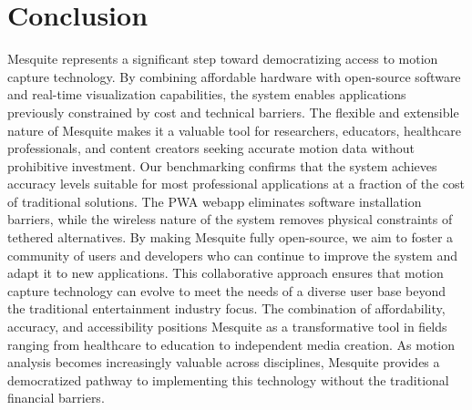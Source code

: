 \documentclass[lettersize,journal]{IEEEtran}
\begin{document}
\section{Conclusion}
Mesquite represents a significant step toward democratizing access to motion capture technology. By combining affordable hardware with open-source software and real-time visualization capabilities, the system enables applications previously constrained by cost and technical barriers. The flexible and extensible nature of Mesquite makes it a valuable tool for researchers, educators, healthcare professionals, and content creators seeking accurate motion data without prohibitive investment.
Our benchmarking confirms that the system achieves accuracy levels suitable for most professional applications at a fraction of the cost of traditional solutions. The PWA webapp eliminates software installation barriers, while the wireless nature of the system removes physical constraints of tethered alternatives. By making Mesquite fully open-source, we aim to foster a community of users and developers who can continue to improve the system and adapt it to new applications. This collaborative approach ensures that motion capture technology can evolve to meet the needs of a diverse user base beyond the traditional entertainment industry focus. The combination of affordability, accuracy, and accessibility positions Mesquite as a transformative tool in fields ranging from healthcare to education to independent media creation. As motion analysis becomes increasingly valuable across disciplines, Mesquite provides a democratized pathway to implementing this technology without the traditional financial barriers.









\newpage
\end{document}
